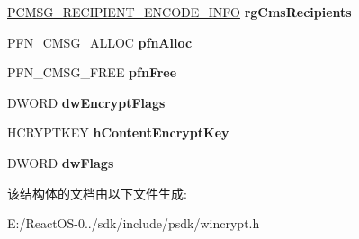 \begin{DoxyCompactItemize}
\mbox{\label{struct___c_m_s_g___c_o_n_t_e_n_t___e_n_c_r_y_p_t___i_n_f_o_a936cf3a9313da23734b51a42e6b6f91b}} 
\hyperlink{struct___c_m_s_g___r_e_c_i_p_i_e_n_t___e_n_c_o_d_e___i_n_f_o}{P\+C\+M\+S\+G\+\_\+\+R\+E\+C\+I\+P\+I\+E\+N\+T\+\_\+\+E\+N\+C\+O\+D\+E\+\_\+\+I\+N\+FO} {\bfseries rg\+Cms\+Recipients}
\item 
\mbox{\label{struct___c_m_s_g___c_o_n_t_e_n_t___e_n_c_r_y_p_t___i_n_f_o_a36c456335a5023ed9f582e9cd8671267}} 
P\+F\+N\+\_\+\+C\+M\+S\+G\+\_\+\+A\+L\+L\+OC {\bfseries pfn\+Alloc}
\item 
\mbox{\label{struct___c_m_s_g___c_o_n_t_e_n_t___e_n_c_r_y_p_t___i_n_f_o_acdd6c5150a9938b5a7e60be18eb60040}} 
P\+F\+N\+\_\+\+C\+M\+S\+G\+\_\+\+F\+R\+EE {\bfseries pfn\+Free}
\item 
\mbox{\label{struct___c_m_s_g___c_o_n_t_e_n_t___e_n_c_r_y_p_t___i_n_f_o_aa85b681a9e03697a59d5a025c9c03415}} 
D\+W\+O\+RD {\bfseries dw\+Encrypt\+Flags}
\item 
\mbox{\label{struct___c_m_s_g___c_o_n_t_e_n_t___e_n_c_r_y_p_t___i_n_f_o_aa4b0f72554983671e24823062a193557}} 
H\+C\+R\+Y\+P\+T\+K\+EY {\bfseries h\+Content\+Encrypt\+Key}
\item 
\mbox{\label{struct___c_m_s_g___c_o_n_t_e_n_t___e_n_c_r_y_p_t___i_n_f_o_a9002e592b0dc9f0551771f502efd21b9}} 
D\+W\+O\+RD {\bfseries dw\+Flags}
\end{DoxyCompactItemize}


该结构体的文档由以下文件生成\+:\begin{DoxyCompactItemize}
\item 
E\+:/\+React\+O\+S-\/0../sdk/include/psdk/wincrypt.\+h\end{DoxyCompactItemize}
